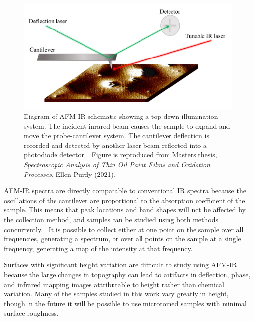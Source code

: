 \begin{figure}[H]
\centering
  \includegraphics[width=\linewidth]{afm_diagram}
\caption[Diagram of AFM-IR schematic showing a top-down illumination system.]{Diagram of AFM-IR schematic showing a top-down illumination system. The incident inrared beam causes the sample to expand and move the probe-cantilever system. The cantilever deflection is recorded and detected by another laser beam reflected into a photodiode detector.~\autocite{Morsch,dazzi2017} Figure is reproduced from Masters thesis, \textit{Spectroscopic Analysis of Thin Oil Paint Films and Oxidation Processes}, Ellen Purdy (2021).}
\label{fig:afm_diagram}
\end{figure}

AFM-IR spectra are directly comparable to conventional IR spectra because the oscillations of the cantilever are proportional to the absorption coefficient of the sample. This means that peak locations and band shapes will not be affected by the collection method, and samples can be studied using both methods concurrently.~\autocite{dazzi2017,kurouski} It is possible to collect either at one point on the sample over all frequencies, generating a spectrum, or over all points on the sample at a single frequency, generating a map of the intensity at that frequency.

Surfaces with significant height variation are difficult to study using AFM-IR because the large changes in topography can lead to artifacts in deflection, phase, and infrared mapping images attributable to height rather than chemical variation. Many of the samples studied in this work vary greatly in height, though in the future it will be possible to use microtomed samples with minimal surface roughness. 


